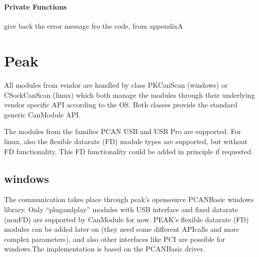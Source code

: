 \documentclass[a4paper,10pt,english]{sphinxmanual}
\begin{document}
\begin{fulllineitems}
\label{\detokenize{vendors/anagate:_CPPv410AnaCanScan}}%
\pysigstartmultiline
{}%
\pysigstopmultiline~\subsubsection*{Private Functions}

\begin{fulllineitems}
\label{\detokenize{vendors/anagate:_CPPv4N10AnaCanScan19ana_canGetErrorTextEl}}%
\pysigstartmultiline
{}%
\pysigstopmultiline
give back the error message fro the code, from appendixA 

\end{fulllineitems}


\end{fulllineitems}



\chapter{Peak}
\label{\detokenize{vendors/peak:peak}}\label{\detokenize{vendors/peak::doc}}
All modules from vendor {\hyperref[\detokenize{vendors/peak:peak}]{}} are handled by class PKCanScan (windows) or CSockCanScan (linux) which
both manage the modules through their underlying vendor specific API according to the OS.
Both classes provide the standard generic CanModule API.

The modules from the families PCAN USB and USB Pro are supported. For linux, also the flexible
datarate (FD) module types are supported, but without FD functionality. This FD functionality
could be added in principle if requested.


\section{windows}
\label{\detokenize{vendors/peak:windows}}
The communication takes place through peak’s open\sphinxhyphen{}source PCAN\sphinxhyphen{}Basic windows library. Only “plug\sphinxhyphen{}and\sphinxhyphen{}play”
modules with USB interface and fixed datarate (non\sphinxhyphen{}FD) are supported by CanModule for now. PEAK’s
flexible datarate (FD) modules can be added later on (they need some different API\sphinxhyphen{}calls and more complex parameters), and also
other interfaces like PCI are possible for windows.The implementation is based on the PCAN\sphinxhyphen{}Basic driver.
\end{document}
